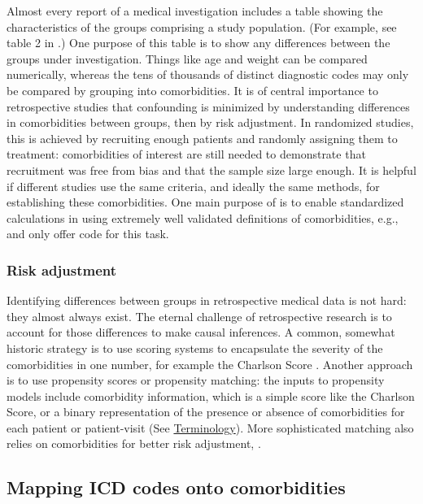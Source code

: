 \documentclass[article]{jss}
\begin{document}
Almost every report of a medical investigation includes a table showing
the characteristics of the groups comprising a study population. (For
example, see table 2 in \citet{frank_risk-adjusted_2014}.) One purpose
of this table is to show any differences between the groups under
investigation. Things like age and weight can be compared numerically,
whereas the tens of thousands of distinct diagnostic codes may only be
compared by grouping into comorbidities. It is of central importance to
retrospective studies that confounding is minimized by understanding
differences in comorbidities between groups, then by risk adjustment. In
randomized studies, this is achieved by recruiting enough patients and
randomly assigning them to treatment: comorbidities of interest are
still needed to demonstrate that recruitment was free from bias and that
the sample size large enough. It is helpful if different studies use the
same criteria, and ideally the same methods, for establishing these
comorbidities. One main purpose of  is to enable standardized
calculations in  using extremely well validated definitions
of comorbidities, e.g., \citet{quan_updating_2011} and
\citet{AgencyforHealthcareResearchandQuality_Elixhausercomorbiditysoftware_2018}
only offer  code for this task.

\hypertarget{risk-adjustment}{%
\subsubsection{Risk adjustment}\label{risk-adjustment}}

Identifying differences between groups in retrospective medical data is
not hard: they almost always exist. The eternal challenge of
retrospective research is to account for those differences to make
causal inferences. A common, somewhat historic strategy is to use
scoring systems to encapsulate the severity of the comorbidities in one
number, for example the Charlson Score \citep{charlson_new_1987}.
Another approach is to use propensity scores or propensity matching: the
inputs to propensity models include comorbidity information, which is a
simple score like the Charlson Score, or a binary representation of the
presence or absence of comorbidities for each patient or patient-visit
(See \protect\hyperlink{terminology}{Terminology}). More sophisticated
matching also relies on comorbidities for better risk adjustment,
\citep[e.g.,][]{diamond_genetic_2012}.

\hypertarget{mapping-icd-codes-onto-comorbidities}{%
\subsection{Mapping ICD codes onto
comorbidities}\label{mapping-icd-codes-onto-comorbidities}}
\end{document}
